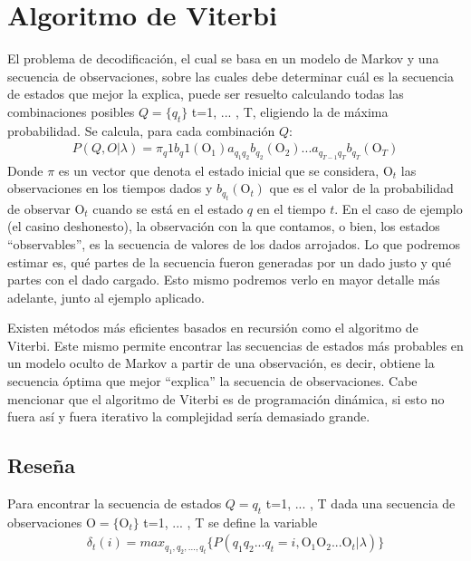 \section{Algoritmo de Viterbi}

El problema de decodificación, el cual se basa en un modelo de Markov y una secuencia de observaciones, sobre las cuales debe determinar cuál es la secuencia de estados que mejor la explica, puede ser resuelto calculando todas las combinaciones posibles $Q=\{q_t\}$   t=1, ... , T, eligiendo la de máxima probabilidad. Se calcula, para cada combinación $Q$:
\begin{align}
P(Q,O |\lambda)=\pi_q1b_q1(\mathrm{O}_1)a_{q_1q_2}b_{q_2}(\mathrm{O}_2) ... a_{q_{T-1}q_T}b_{q_T}(\mathrm{O}_T)
\end{align}
Donde $\pi$ es un vector que denota el estado inicial que se considera, O$_t$ las observaciones en los tiempos dados y $b_{q_t}(\mathrm{O}_t)$ que es el valor de la probabilidad de observar O${_t}$ cuando se está en el estado $q$ en el tiempo $t$. En el caso de ejemplo (el casino deshonesto), la observación con la que contamos, o bien, los estados \enquote{observables}, es la secuencia de valores de los dados arrojados. Lo que podremos estimar es, qué partes de la secuencia fueron generadas por un dado justo y qué partes con el dado cargado. Esto mismo podremos verlo en mayor detalle más adelante, junto al ejemplo aplicado.

Existen métodos más eficientes basados en recursión como el algoritmo de Viterbi. Este mismo permite encontrar las secuencias de estados más probables en un modelo oculto de Markov a partir de una observación, es decir, obtiene la secuencia óptima que mejor \enquote{explica} la secuencia de observaciones. Cabe mencionar que el algoritmo de Viterbi es de programación dinámica, si esto no fuera así y fuera iterativo la complejidad sería demasiado grande.

\subsection{Reseña}
Para encontrar la secuencia de estados $Q={q_t}$   t=1, ... , T dada una secuencia de observaciones $\mathrm{O}=\{\mathrm{O}_t\}$     t=1, ... , T se define la variable
\begin{align}
\delta_t(i)=max_{q_1,q_2,...,q_t}\{P(q_1q_2 ... q_t=i, \mathrm{O}_1\mathrm{O}_2 ... \mathrm{O}_t |\lambda )\} 
\end{align}

